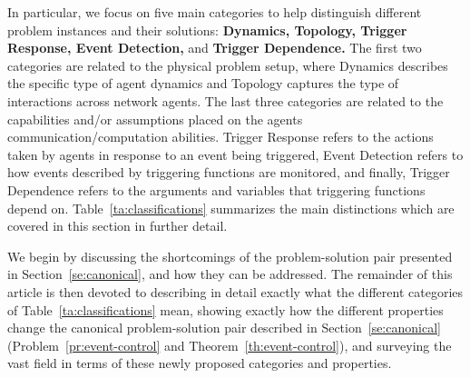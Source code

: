 \documentclass{autart}
\newcommand{\dynamics}{\textcircled{A}}
\newcommand{\topology}{\textcircled{B}}
\newcommand{\triggertype}{\textcircled{C}}
\newcommand{\triggereval}{\textcircled{D}}
\newcommand{\triggerdependence}{\textcircled{E}}
\newcommand{\inbetween}{\textcircled{F}}
\newcommand{\uncertainties}{\textcircled{G}}
\begin{document}
In particular, we focus on five main categories to help distinguish
different problem instances and their solutions: \textbf{Dynamics,
  Topology, Trigger Response, Event Detection,} and \textbf{Trigger
  Dependence.} {The first two categories are related to the
  physical problem setup, where Dynamics describes the specific type
  of agent dynamics and Topology captures the type of interactions
  across network agents.  The last three categories are related to the
  capabilities and/or assumptions placed on the agents
  communication/computation abilities.  Trigger Response refers to the
  actions taken by agents in response to an event being triggered,
  Event Detection refers to how events described by triggering
  functions are monitored, and finally, Trigger Dependence refers to
  the arguments and variables that triggering functions depend on.  }
Table~\ref{ta:classifications} summarizes the main distinctions which
are covered in this section in further detail.

We begin by discussing the shortcomings of the
problem-solution pair presented in Section~\ref{se:canonical}, 
and how they can be addressed. The remainder
of this article is then devoted to describing in detail exactly what
the different categories of Table~\ref{ta:classifications} mean, showing exactly how the
different properties change the canonical problem-solution pair
described in Section~\ref{se:canonical}
(Problem~\ref{pr:event-control} and Theorem~\ref{th:event-control}),
and surveying the vast field in terms of these newly proposed
categories and properties. 

\end{document}
